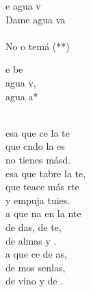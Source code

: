 \documentclass[12pt]{article}
\begin{document}
\begin{multicols*}{2}
\begin{cancion}%
	e agua v \\
	Dame agua va \\
{}\vspace*{-0.4cm}\\
	No o temá (**)\\
\end{cancion}%

\begin{cancion}%
	\begin{chorus}%
	e be \\
	 agua v,\\
	 agua a*\\
	\end{chorus}%
	\jump\\
	esa que ce la te \\
	que cndo la es \\
	no tienes másd. \\
	esa que tabre la te,  \\
	que teace más rte  \\
	y empuja tuies.\\
\jump
	a que na en la nte  \\
	de das, de te,  \\
	de almas y . \\
	a que ce de as, \\
	de mos senlas,  \\
	de vino y de . \\
\end{cancion}%


\end{multicols*}
\end{document}
